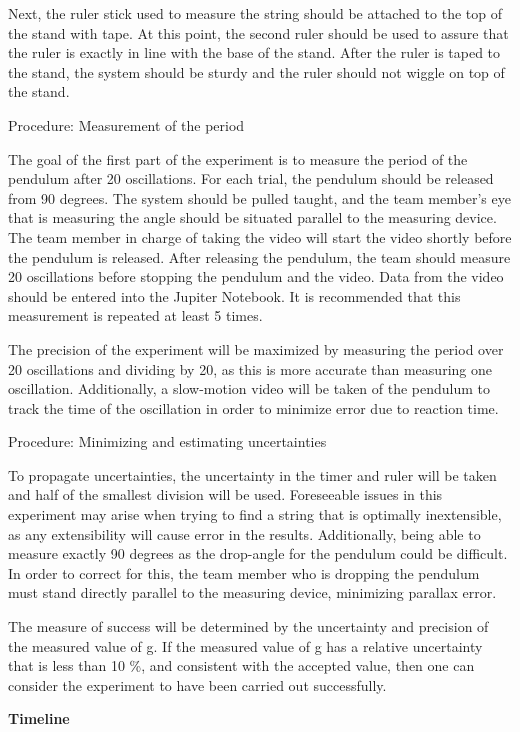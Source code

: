 Next, the ruler stick used to measure the string should be attached to the top of the stand with tape. At this point, the second ruler should be used to assure that the ruler is exactly in line with the base of the stand. After the ruler is taped to the stand, the system should be sturdy and the ruler should not wiggle on top of the stand.

Procedure: Measurement of the period

The goal of the first part of the experiment is to measure the period of the pendulum after 20 oscillations. For each trial, the pendulum should be released from 90 degrees. The system should be pulled taught, and the team member's eye that is measuring the angle should be situated parallel to the measuring device. The team member in charge of taking the video will start the video shortly before the pendulum is released. After releasing the pendulum, the team should measure 20 oscillations before stopping the pendulum and the video. Data from the video should be entered into the Jupiter Notebook. It is recommended that this measurement is repeated at least 5 times.

The precision of the experiment will be maximized by measuring the period over 20 oscillations and dividing by 20, as this is more accurate than measuring one oscillation. Additionally, a slow-motion video will be taken of the pendulum to track the time of the oscillation in order to minimize error due to reaction time. 

Procedure: Minimizing and estimating uncertainties

To propagate uncertainties, the uncertainty in the timer and ruler will be taken and half of the smallest division will be used. Foreseeable issues in this experiment may arise when trying to find a string that is optimally inextensible, as any extensibility will cause error in the results. Additionally, being able to measure exactly 90 degrees as the drop-angle for the pendulum could be difficult. In order to correct for this, the team member who is dropping the pendulum must stand directly parallel to the measuring device, minimizing parallax error. 

The measure of success will be determined by the uncertainty and precision of the measured value of g. If the measured value of g has a relative uncertainty that is less than 10 \%, and consistent with the accepted value, then one can consider the experiment to have been carried out successfully. 

\textbf{Timeline}

